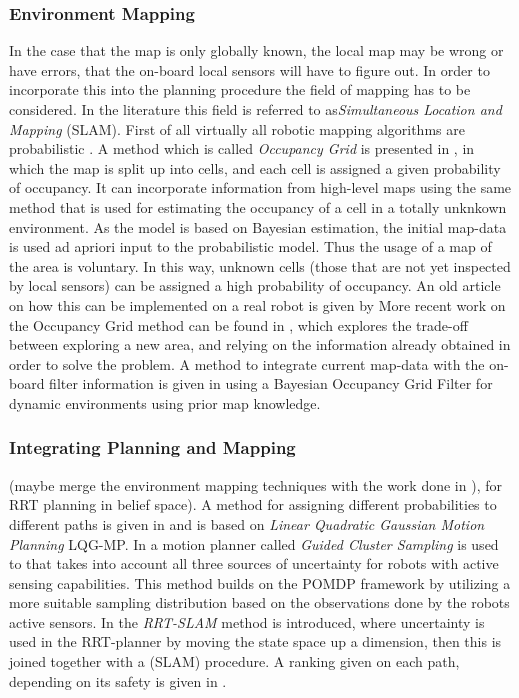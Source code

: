 \subsubsection{Environment Mapping}
In the case that the map is only globally known, the local map may be wrong or
have errors, that the on-board local sensors will have to figure out. In order
to incorporate this into the planning procedure the field of mapping has to be
considered. In the literature this field is referred to as\textit{Simultaneous
  Location and Mapping} (SLAM). First of all virtually all robotic mapping
algorithms are probabilistic \cite{thrunRoboticMappingSurvey}. %
A method which is called \textit{Occupancy Grid} is presented in
\cite{elfes1989using}, in which the map is split up into cells, and each cell is
assigned a given probability of occupancy. It can incorporate information from
high-level maps using the same method that is used for estimating the occupancy
of a cell in a totally unknkown environment. As the model is based on Bayesian
estimation, the initial map-data is used ad apriori input to the probabilistic
model. Thus the usage of a map of the area is voluntary. In this way, unknown
cells (those that are not yet inspected by local sensors) can be assigned a high
probability of occupancy. An old article on how this can be implemented on a
real robot is given by \cite[Krugman]{kriegman1987mobile} More recent work on
the Occupancy Grid method can be found in
\cite{carrilloAutonomousRoboticExploration2015}, which explores the trade-off
between exploring a new area, and relying on the information already obtained in
order to solve the problem. A method to integrate current map-data with the on-board filter information is given in \cite{gindelebrechtelschroderdillmann} using a Bayesian Occupancy Grid Filter for dynamic environments using prior map knowledge.
\subsubsection{Integrating Planning and Mapping}
(maybe merge the environment mapping techniques with the work done in
\cite[Bry]{bryRapidlyexploringRandomBelief2011}), for RRT planning in belief
space). A method for assigning different probabilities to different paths is given in \cite{bergabbellgoldberg} and is based on \textit{Linear Quadratic Gaussian Motion Planning} LQG-MP. In \cite{kurniawatibandyopadhai} a motion planner called \textit{Guided Cluster Sampling} is used to that takes into account all three sources of uncertainty for robots with active sensing capabilities. This method builds on the POMDP framework by utilizing a more suitable sampling distribution based on the observations done by the robots active sensors. In \cite{huanggupta} the \textit{RRT-SLAM} method is introduced, where uncertainty is used in the RRT-planner by moving the state space up a dimension, then this is joined together with a  (SLAM) procedure. A ranking given on each path, depending on its safety is given in \cite{blakebordallohawasly2018}.
